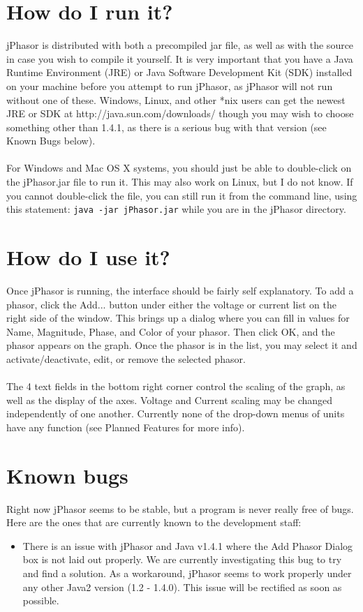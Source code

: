 \documentclass[10pt]{article}
\begin{document}
\section*{How do I run it?}
jPhasor is distributed with both a precompiled jar file, as well as with the source in case you wish to compile it yourself. It is very important that you have a Java Runtime Environment (JRE) or Java Software Development Kit (SDK) installed on your machine before you attempt to run jPhasor, as jPhasor will not run without one of these. Windows, Linux, and other *nix users can get the newest JRE or SDK at http://java.sun.com/downloads/ though you may wish to choose something other than 1.4.1, as there is a serious bug with that version (see Known Bugs below).
\\ \\
For Windows and Mac OS X systems, you should just be able to double-click on the jPhasor.jar file to run it. This may also work on Linux, but I do not know. If you cannot double-click the file, you can still run it from the command line, using this statement: {\tt java -jar jPhasor.jar} while you are in the jPhasor directory.

\section*{How do I use it?}
Once jPhasor is running, the interface should be fairly self explanatory. To add a phasor, click the Add... button under either the voltage or current list on the right side of the window. This brings up a dialog where you can fill in values for Name, Magnitude, Phase, and Color of your phasor. Then click OK, and the phasor appears on the graph.  Once the phasor is in the list, you may select it and activate/deactivate, edit, or remove the selected phasor.
\\ \\
The 4 text fields in the bottom right corner control the scaling of the graph, as well as the
display of the axes. Voltage and Current scaling may be changed independently of one another. Currently none of the drop-down menus of units have any function (see Planned Features for more info).

\section*{Known bugs}
Right now jPhasor seems to be stable, but a program is never really free of bugs. Here are the ones that are currently known to the development staff:
\begin{itemize}
	\item There is an issue with jPhasor and Java v1.4.1 where the Add Phasor Dialog box is not laid out properly. We are currently investigating this bug to try and find a solution. As a workaround, jPhasor seems to work properly under any other Java2 version (1.2 - 1.4.0). This issue will be rectified as soon as possible.
\end{itemize}
\end{document}
